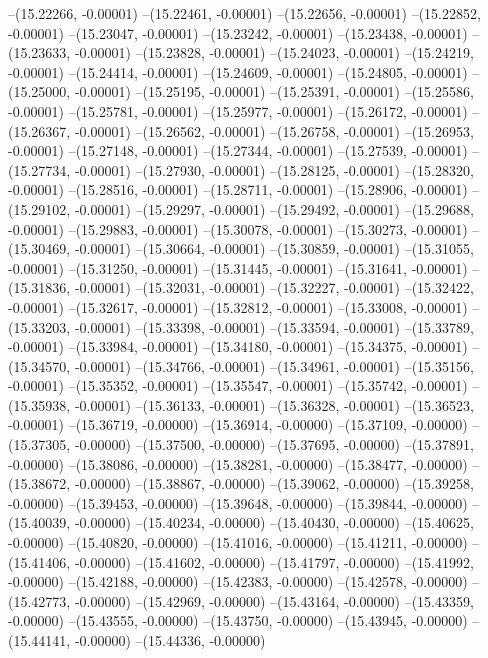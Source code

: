 --(15.22266, -0.00001)
--(15.22461, -0.00001)
--(15.22656, -0.00001)
--(15.22852, -0.00001)
--(15.23047, -0.00001)
--(15.23242, -0.00001)
--(15.23438, -0.00001)
--(15.23633, -0.00001)
--(15.23828, -0.00001)
--(15.24023, -0.00001)
--(15.24219, -0.00001)
--(15.24414, -0.00001)
--(15.24609, -0.00001)
--(15.24805, -0.00001)
--(15.25000, -0.00001)
--(15.25195, -0.00001)
--(15.25391, -0.00001)
--(15.25586, -0.00001)
--(15.25781, -0.00001)
--(15.25977, -0.00001)
--(15.26172, -0.00001)
--(15.26367, -0.00001)
--(15.26562, -0.00001)
--(15.26758, -0.00001)
--(15.26953, -0.00001)
--(15.27148, -0.00001)
--(15.27344, -0.00001)
--(15.27539, -0.00001)
--(15.27734, -0.00001)
--(15.27930, -0.00001)
--(15.28125, -0.00001)
--(15.28320, -0.00001)
--(15.28516, -0.00001)
--(15.28711, -0.00001)
--(15.28906, -0.00001)
--(15.29102, -0.00001)
--(15.29297, -0.00001)
--(15.29492, -0.00001)
--(15.29688, -0.00001)
--(15.29883, -0.00001)
--(15.30078, -0.00001)
--(15.30273, -0.00001)
--(15.30469, -0.00001)
--(15.30664, -0.00001)
--(15.30859, -0.00001)
--(15.31055, -0.00001)
--(15.31250, -0.00001)
--(15.31445, -0.00001)
--(15.31641, -0.00001)
--(15.31836, -0.00001)
--(15.32031, -0.00001)
--(15.32227, -0.00001)
--(15.32422, -0.00001)
--(15.32617, -0.00001)
--(15.32812, -0.00001)
--(15.33008, -0.00001)
--(15.33203, -0.00001)
--(15.33398, -0.00001)
--(15.33594, -0.00001)
--(15.33789, -0.00001)
--(15.33984, -0.00001)
--(15.34180, -0.00001)
--(15.34375, -0.00001)
--(15.34570, -0.00001)
--(15.34766, -0.00001)
--(15.34961, -0.00001)
--(15.35156, -0.00001)
--(15.35352, -0.00001)
--(15.35547, -0.00001)
--(15.35742, -0.00001)
--(15.35938, -0.00001)
--(15.36133, -0.00001)
--(15.36328, -0.00001)
--(15.36523, -0.00001)
--(15.36719, -0.00000)
--(15.36914, -0.00000)
--(15.37109, -0.00000)
--(15.37305, -0.00000)
--(15.37500, -0.00000)
--(15.37695, -0.00000)
--(15.37891, -0.00000)
--(15.38086, -0.00000)
--(15.38281, -0.00000)
--(15.38477, -0.00000)
--(15.38672, -0.00000)
--(15.38867, -0.00000)
--(15.39062, -0.00000)
--(15.39258, -0.00000)
--(15.39453, -0.00000)
--(15.39648, -0.00000)
--(15.39844, -0.00000)
--(15.40039, -0.00000)
--(15.40234, -0.00000)
--(15.40430, -0.00000)
--(15.40625, -0.00000)
--(15.40820, -0.00000)
--(15.41016, -0.00000)
--(15.41211, -0.00000)
--(15.41406, -0.00000)
--(15.41602, -0.00000)
--(15.41797, -0.00000)
--(15.41992, -0.00000)
--(15.42188, -0.00000)
--(15.42383, -0.00000)
--(15.42578, -0.00000)
--(15.42773, -0.00000)
--(15.42969, -0.00000)
--(15.43164, -0.00000)
--(15.43359, -0.00000)
--(15.43555, -0.00000)
--(15.43750, -0.00000)
--(15.43945, -0.00000)
--(15.44141, -0.00000)
--(15.44336, -0.00000)
